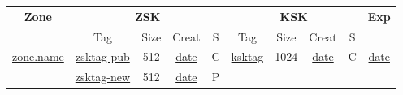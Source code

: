\begin{center}
\begin{tabular}{|c|c|c|c|c|c|c|c|c|c|}
\hline
{\bf Zone} &
\multicolumn{4}{c|}{{\bf ZSK}} &
\multicolumn{4}{c|}{{\bf KSK}} &
{\bf Exp} \\
\cline{2-9}

 & Tag & Size & Creat & S & Tag & Size & Creat & S & \\
\hline

\underline{zone.name}	&
\underline{zsktag-pub}	&
512			&
\underline{date}	&
C			&
\underline{ksktag}	&
1024			&
\underline{date}	&
C			&
\underline{date}	\\

\cline{2-9}

			&
\underline{zsktag-new}	&
512			&
\underline{date}	&
P			&
& & & & \\

\hline
\end{tabular}
\end{center}



